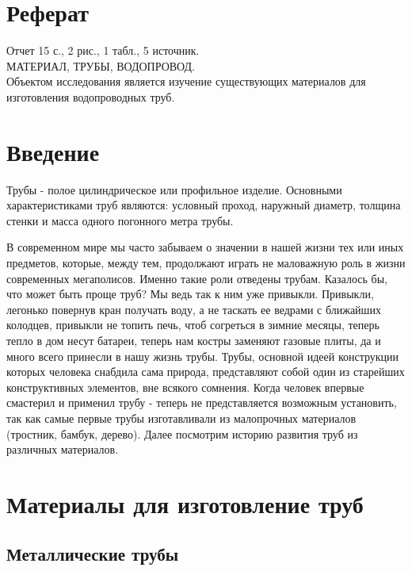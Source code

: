 \documentclass[a4paper,12pt,russian]{report}
\begin{document}


\newpage
{}
\setcounter{page}{2}

\tableofcontents

\section*{Реферат}

\noindent Отчет 15 с., 2 рис., 1 табл., 5 источник. \\
МАТЕРИАЛ, ТРУБЫ, ВОДОПРОВОД. \\
Объектом исследования является изучение существующих материалов для изготовления водопроводных труб. \\

\section{Введение}

Трубы - полое цилиндрическое или профильное изделие. Основными характеристиками труб являются: условный проход, наружный диаметр, толщина стенки и масса одного погонного метра трубы.

В современном мире мы часто забываем о значении в нашей жизни тех или иных предметов, которые, между тем, продолжают играть не маловажную роль в жизни современных мегаполисов. Именно такие роли отведены трубам. Казалось бы, что может быть проще труб? Мы ведь так к ним уже привыкли. Привыкли, легонько повернув кран получать воду, а не таскать ее ведрами с ближайших колодцев, привыкли не топить печь, чтоб согреться в зимние месяцы, теперь тепло в дом несут батареи, теперь нам костры заменяют газовые плиты, да и много всего принесли в нашу жизнь трубы.
Трубы, основной идеей конструкции которых человека снабдила сама природа, представляют собой один из старейших конструктивных элементов, вне всякого сомнения. Когда человек впервые смастерил и применил трубу - теперь не представляется возможным установить, так как самые первые трубы изготавливали из малопрочных материалов (тростник, бамбук, дерево).
Далее посмотрим историю развития труб из различных материалов.

\section{Материалы для изготовление труб}

\subsection{Металлические трубы}
\end{document}
